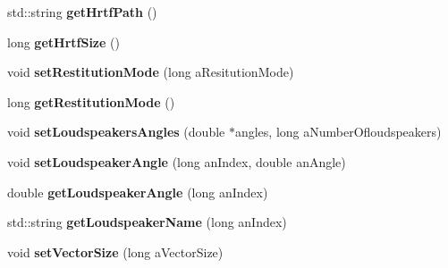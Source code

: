 \begin{DoxyCompactItemize}
\item 
\hypertarget{class_ambisonics_multi_decoder_a40add610c10c5ab4aacde21f72bba693}{std\-::string {\bfseries get\-Hrtf\-Path} ()}\label{class_ambisonics_multi_decoder_a40add610c10c5ab4aacde21f72bba693}

\item 
\hypertarget{class_ambisonics_multi_decoder_a7af8587566c6a9365a6e8a35de6282fc}{long {\bfseries get\-Hrtf\-Size} ()}\label{class_ambisonics_multi_decoder_a7af8587566c6a9365a6e8a35de6282fc}

\item 
\hypertarget{class_ambisonics_multi_decoder_af87804a04444774b6e3ab424792e715a}{void {\bfseries set\-Restitution\-Mode} (long a\-Resitution\-Mode)}\label{class_ambisonics_multi_decoder_af87804a04444774b6e3ab424792e715a}

\item 
\hypertarget{class_ambisonics_multi_decoder_a6f1ba1ab97697340b884eba6db91b3ab}{long {\bfseries get\-Restitution\-Mode} ()}\label{class_ambisonics_multi_decoder_a6f1ba1ab97697340b884eba6db91b3ab}

\item 
\hypertarget{class_ambisonics_multi_decoder_a81bc508a7b4eccd575e553fc444e06eb}{void {\bfseries set\-Loudspeakers\-Angles} (double $\ast$angles, long a\-Number\-Ofloudspeakers)}\label{class_ambisonics_multi_decoder_a81bc508a7b4eccd575e553fc444e06eb}

\item 
\hypertarget{class_ambisonics_multi_decoder_a0e088d443817816bfae6d91585f2a942}{void {\bfseries set\-Loudspeaker\-Angle} (long an\-Index, double an\-Angle)}\label{class_ambisonics_multi_decoder_a0e088d443817816bfae6d91585f2a942}

\item 
\hypertarget{class_ambisonics_multi_decoder_abbdfbe8b43c1e6c6e022da6a3b3da3fd}{double {\bfseries get\-Loudspeaker\-Angle} (long an\-Index)}\label{class_ambisonics_multi_decoder_abbdfbe8b43c1e6c6e022da6a3b3da3fd}

\item 
\hypertarget{class_ambisonics_multi_decoder_abc5705f2f1f7b2ca3e16d2248553c31a}{std\-::string {\bfseries get\-Loudspeaker\-Name} (long an\-Index)}\label{class_ambisonics_multi_decoder_abc5705f2f1f7b2ca3e16d2248553c31a}

\item 
\hypertarget{class_ambisonics_multi_decoder_a4b625d2bf9435294212eac96cf179104}{void {\bfseries set\-Vector\-Size} (long a\-Vector\-Size)}\label{class_ambisonics_multi_decoder_a4b625d2bf9435294212eac96cf179104}


\end{DoxyCompactItemize}
